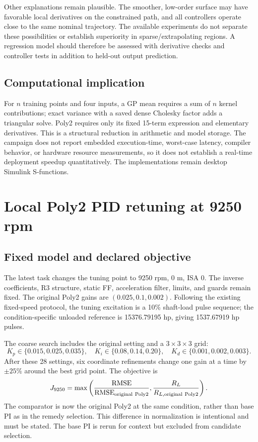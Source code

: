 \documentclass[11pt,a4paper,oneside]{report}
\newcommand{\RMSE}{\operatorname{RMSE}}
\begin{document}
Other explanations remain plausible. The smoother, low-order surface may have favorable local derivatives on the constrained path, and all controllers operate close to the same nominal trajectory. The available experiments do not separate these possibilities or establish superiority in sparse/extrapolating regions. A regression model should therefore be assessed with derivative checks and controller tests in addition to held-out output prediction.

\section{Computational implication}
For $n$ training points and four inputs, a GP mean requires a sum of $n$ kernel contributions; exact variance with a saved dense Cholesky factor adds a triangular solve. Poly2 requires only its fixed 15-term expression and elementary derivatives. This is a structural reduction in arithmetic and model storage. The campaign does not report embedded execution-time, worst-case latency, compiler behavior, or hardware resource measurements, so it does not establish a real-time deployment speedup quantitatively. The implementations remain desktop Simulink S-functions.

\chapter{Local Poly2 PID retuning at 9250 rpm}
\section{Fixed model and declared objective}
The latest task changes the tuning point to 9250 rpm, 0 m, ISA 0. The inverse coefficients, R3 structure, static FF, acceleration filter, limits, and guards remain fixed. The original Poly2 gains are $(0.025,0.1,0.002)$. Following the existing fixed-speed protocol, the tuning excitation is a 10\% shaft-load pulse sequence; the condition-specific unloaded reference is 15376.79195 hp, giving 1537.67919 hp pulses.

The coarse search includes the original setting and a $3\times3\times3$ grid:
\begin{equation}
K_p\in\{0.015,0.025,0.035\},\quad
K_i\in\{0.08,0.14,0.20\},\quad
K_d\in\{0.001,0.002,0.003\}.
\end{equation}
After these 28 settings, six coordinate refinements change one gain at a time by $\pm25\%$ around the best grid point. The objective is
\begin{equation}
J_{9250}=\max\left(\frac{\RMSE}{\RMSE_{\rm original\ Poly2}},
\frac{R_L}{R_{L,\rm original\ Poly2}}\right).
\end{equation}
The comparator is now the original Poly2 at the same condition, rather than base PI as in the remedy selection. This difference in normalization is intentional and must be stated. The base PI is rerun for context but excluded from candidate selection.
\end{document}
